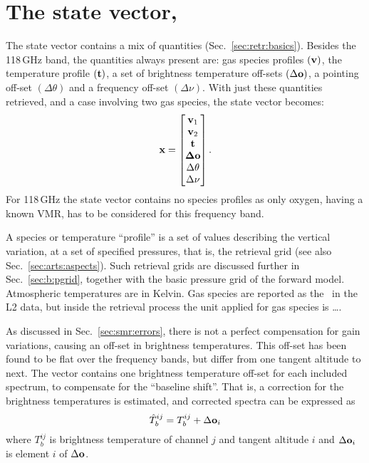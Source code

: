 \section{The state vector, \SttVct}
\label{sec:x}
%
The state vector contains a mix of quantities (Sec.~\ref{sec:retr:basics}).
Besides the 118\,GHz band, the quantities always present are: gas species
profiles $(\mathbf{v})$, the temperature profile $(\mathbf{t})$, a set of
brightness temperature off-sets $(\Delta\mathbf{o})$, a pointing off-set
$(\Delta\theta)$ and a frequency off-set $(\Delta\nu)$. With
just these quantities retrieved, and a case involving two gas species, the
state vector becomes:
\begin{equation}
  \label{eq:x:example}
  \mathbf{x} =
  \begin{bmatrix}
    \mathbf{v}_1\\ 
    \mathbf{v}_2\\ 
    \mathbf{t}\\ 
    \mathbf{\Delta\mathbf{o}}\\ 
    \Delta\theta\\ 
    \Delta\nu 
  \end{bmatrix}.
\end{equation}
For 118\,GHz the state vector contains no species profiles as only oxygen,
having a known VMR, has to be considered for this frequency band.

A species or temperature ``profile'' is a set of values describing the vertical
variation, at a set of specified pressures, that is, the retrieval grid (see
also Sec.~\ref{sec:arts:aspects}). Such retrieval grids are discussed further
in Sec.~\ref{sec:b:pgrid}, together with the basic pressure grid of the forward
model. Atmospheric temperatures are in Kelvin. Gas species are reported as the
\VMR\ in the L2 data, but inside the retrieval process the unit applied for gas
species is \dots.
\\

As discussed in Sec.~\ref{sec:smr:errors}, there is not a perfect compensation
for gain variations, causing an off-set in brightness temperatures. This
off-set has been found to be flat over the frequency bands, but differ from one
tangent altitude to next. The vector  contains one
brightness temperature off-set for each included spectrum, to compensate for
the ``baseline shift''. That is, a correction for the brightness temperatures is
estimated, and corrected spectra can be expressed as
\begin{equation}
  \label{eq:retr:baseline}
  \hat{T}_b^{ij} = T_b^{ij} + \Delta\mathbf{o}_i
\end{equation}
where $T_b^{ij}$ is brightness temperature of channel $j$ and tangent altitude
$i$ and $\Delta\mathbf{o}_i$ is element $i$ of $\Delta\mathbf{o}$.

